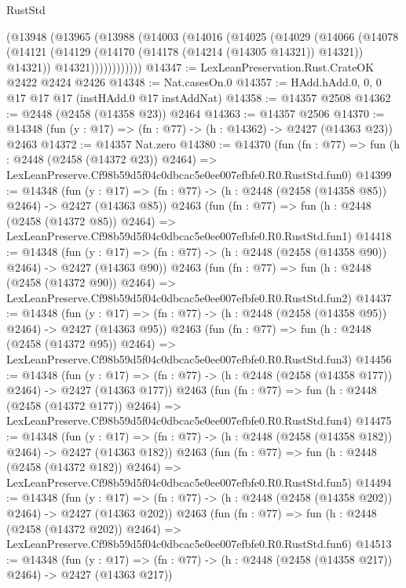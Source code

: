 \begin{lexlean}{RustStd}
\begin{coremodule}
          (@13948
            (@13965
              (@13988
                (@14003
                  (@14016
                    (@14025
                      (@14029
                        (@14066
                          (@14078
                            (@14121
                              (@14129 (@14170 (@14178 (@14214 (@14305 @14321)) @14321)) @14321))
                            @14321))))))))))))
@14347 := LexLeanPreservation.Rust.CrateOK @2422 @2424 @2426
@14348 := Nat.casesOn.{0}
@14357 := HAdd.hAdd.{0, 0, 0} @17 @17 @17 (instHAdd.{0} @17 instAddNat)
@14358 := @14357 @2508
@14362 := @2448 (@2458 (@14358 @23)) @2464
@14363 := @14357 @2506
@14370 := @14348 (fun (y : @17) => (fn : @77) -> (h : @14362) -> @2427 (@14363 @23)) @2463
@14372 := @14357 Nat.zero
@14380 := @14370
    (fun (fn : @77) =>
    fun (h : @2448 (@2458 (@14372 @23)) @2464) =>
    LexLeanPreserve.Cf98b59d5f04c0dbcac5e0ee007efbfe0.R0.RustStd.fun0)
@14399 := @14348
    (fun (y : @17) => (fn : @77) -> (h : @2448 (@2458 (@14358 @85)) @2464) -> @2427 (@14363 @85))
    @2463
    (fun (fn : @77) =>
    fun (h : @2448 (@2458 (@14372 @85)) @2464) =>
    LexLeanPreserve.Cf98b59d5f04c0dbcac5e0ee007efbfe0.R0.RustStd.fun1)
@14418 := @14348
    (fun (y : @17) => (fn : @77) -> (h : @2448 (@2458 (@14358 @90)) @2464) -> @2427 (@14363 @90))
    @2463
    (fun (fn : @77) =>
    fun (h : @2448 (@2458 (@14372 @90)) @2464) =>
    LexLeanPreserve.Cf98b59d5f04c0dbcac5e0ee007efbfe0.R0.RustStd.fun2)
@14437 := @14348
    (fun (y : @17) => (fn : @77) -> (h : @2448 (@2458 (@14358 @95)) @2464) -> @2427 (@14363 @95))
    @2463
    (fun (fn : @77) =>
    fun (h : @2448 (@2458 (@14372 @95)) @2464) =>
    LexLeanPreserve.Cf98b59d5f04c0dbcac5e0ee007efbfe0.R0.RustStd.fun3)
@14456 := @14348
    (fun (y : @17) => (fn : @77) -> (h : @2448 (@2458 (@14358 @177)) @2464) -> @2427 (@14363 @177))
    @2463
    (fun (fn : @77) =>
    fun (h : @2448 (@2458 (@14372 @177)) @2464) =>
    LexLeanPreserve.Cf98b59d5f04c0dbcac5e0ee007efbfe0.R0.RustStd.fun4)
@14475 := @14348
    (fun (y : @17) => (fn : @77) -> (h : @2448 (@2458 (@14358 @182)) @2464) -> @2427 (@14363 @182))
    @2463
    (fun (fn : @77) =>
    fun (h : @2448 (@2458 (@14372 @182)) @2464) =>
    LexLeanPreserve.Cf98b59d5f04c0dbcac5e0ee007efbfe0.R0.RustStd.fun5)
@14494 := @14348
    (fun (y : @17) => (fn : @77) -> (h : @2448 (@2458 (@14358 @202)) @2464) -> @2427 (@14363 @202))
    @2463
    (fun (fn : @77) =>
    fun (h : @2448 (@2458 (@14372 @202)) @2464) =>
    LexLeanPreserve.Cf98b59d5f04c0dbcac5e0ee007efbfe0.R0.RustStd.fun6)
@14513 := @14348
    (fun (y : @17) => (fn : @77) -> (h : @2448 (@2458 (@14358 @217)) @2464) -> @2427 (@14363 @217))

\end{coremodule}
\end{lexlean}
